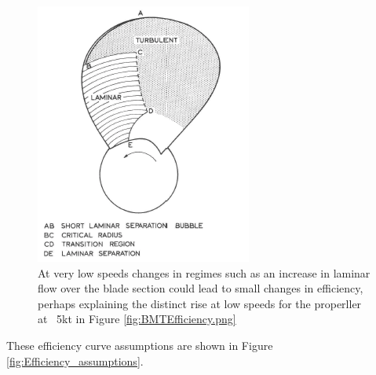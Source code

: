 \documentclass{article}\usepackage[]{graphicx}\usepackage[]{color}
\begin{document}
\begin{figure}
\includegraphics[width=\textwidth]{LaminarProp.png}
\caption{At very low speeds changes in regimes such as an increase in laminar flow over the blade section could lead to small changes in efficiency, perhaps explaining the distinct rise at low speeds for the properller at ~5kt in Figure \ref{fig:BMTEfficiency.png}}
\label{fig:LaminarProp.png}
\end{figure}

These efficiency curve assumptions are shown in Figure \ref{fig:Efficiency_assumptions}.
\end{document}
